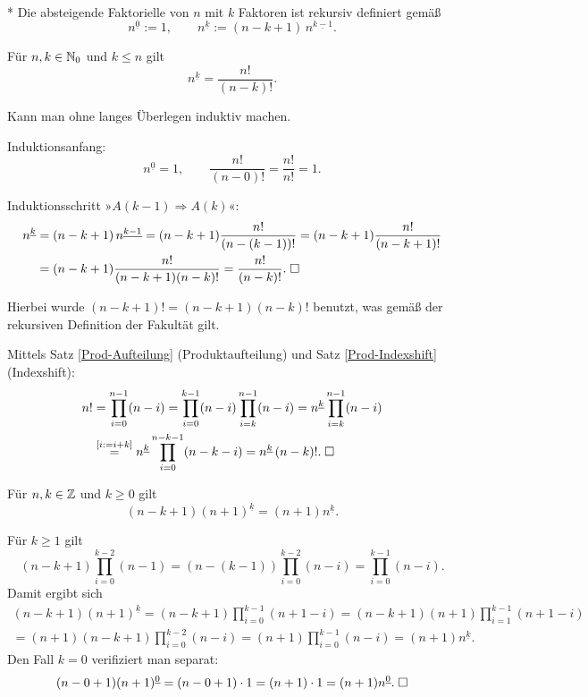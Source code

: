 \begin{Definition}%
%
\label{def:ffac}\mbox{}\\*
Die absteigende Faktorielle von $n$ mit $k$ Faktoren ist rekursiv
definiert gemäß%
\[n^{\underline 0} := 1,\qquad
n^{\underline k} := (n-k+1)\,n^{\underline{k-1}}.\]
\end{Definition}

\begin{Satz}\label{ffac-fac}
Für $n,k\in\mathbb N_0$ und $k\le n$ gilt
\[n^{\underline k} = \frac{n!}{(n-k)!}.\]
\end{Satz}
 Kann man ohne langes Überlegen induktiv
machen.

Induktionsanfang:
\[n^{\underline 0} = 1,\qquad \frac{n!}{(n-0)!}=\frac{n!}{n!}=1.\]

Induktionsschritt »$A(k-1)\Rightarrow A(k)$«:
\begin{align*}
n^{\underline k} &= (n-k+1)\,n^{\underline{k-1}}
= (n-k+1)\frac{n!}{(n-(k-1))!}
= (n-k+1)\frac{n!}{(n-k+1)!}\\
&= (n-k+1)\frac{n!}{(n-k+1)(n-k)!}
= \frac{n!}{(n-k)!}.\;\Box
\end{align*}

\noindent
Hierbei wurde $(n-k+1)!=(n-k+1)(n-k)!$ benutzt, was gemäß
der rekursiven Definition der Fakultät gilt.

 Mittels Satz \ref{Prod-Aufteilung}
(Produktaufteilung) und  Satz \ref{Prod-Indexshift} (Indexshift):%
\begin{align*}
n! &= \prod_{i=0}^{n-1}(n-i)
= \prod_{i=0}^{k-1} (n-i) \prod_{i=k}^{n-1} (n-i)
= n^{\underline k} \prod_{i=k}^{n-1} (n-i)\\
&\stackrel{[i:=i+k]}= n^{\underline k}\prod_{i=0}^{n-k-1} (n-k-i)
= n^{\underline k}\,(n-k)!.\;\Box
\end{align*}

\begin{Satz}\label{ffac-n-rec}
Für $n,k\in\mathbb Z$ und $k\ge 0$ gilt
\[(n-k+1)(n+1)^{\underline k} = (n+1)n^{\underline k}.\]
\end{Satz}
 Für $k\ge 1$ gilt
\[(n-k+1)\prod_{i=0}^{k-2}(n-1)
= (n-(k-1))\prod_{i=0}^{k-2} (n-i) = \prod_{i=0}^{k-1}(n-i).\]
Damit ergibt sich
\begin{gather*}
(n-k+1)(n+1)^{\underline k} = (n-k+1)\prod_{i=0}^{k-1} (n+1-i)
= (n-k+1)(n+1)\prod_{i=1}^{k-1}(n+1-i)\\
= (n+1)(n-k+1)\prod_{i=0}^{k-2}(n-i)
= (n+1)\prod_{i=0}^{k-1}(n-i)
= (n+1)n^{\underline k}.
\end{gather*}
Den Fall $k=0$ verifiziert man separat:
\[(n-0+1)(n+1)^{\underline 0}
= (n-0+1)\cdot 1 = (n+1)\cdot 1 = (n+1)n^{\underline 0}.\;\Box\]

